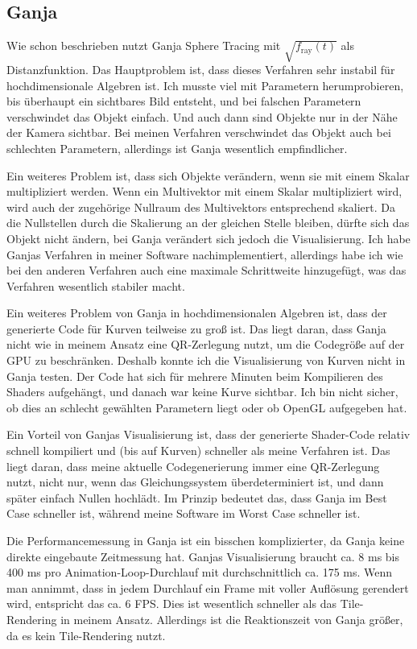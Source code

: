 \documentclass[
	ngerman,%
	accentcolor=9c,%
	ruledheaders=section,%
	class=report,%
	thesis={type=bachelor},%
	fontsize=11pt,%
	parskip=half-,%
	custommargins=true,%
	marginpar=false,%
]{tudapub}
\begin{document}
\subsection{Ganja}
Wie schon beschrieben nutzt Ganja Sphere Tracing mit \(\sqrt{f_\text{ray}(t)}\)
als Distanzfunktion. Das Hauptproblem ist, dass dieses Verfahren sehr instabil für hochdimensionale Algebren ist. Ich musste viel mit Parametern herumprobieren, bis überhaupt ein sichtbares Bild entsteht, und bei falschen Parametern verschwindet das Objekt einfach. Und auch dann sind Objekte nur in der Nähe der Kamera sichtbar. Bei meinen Verfahren verschwindet das Objekt auch bei schlechten Parametern, allerdings ist Ganja wesentlich empfindlicher.

Ein weiteres Problem ist, dass sich Objekte verändern, wenn sie mit einem Skalar multipliziert werden. Wenn ein Multivektor mit einem Skalar multipliziert wird, wird auch der zugehörige Nullraum des Multivektors entsprechend skaliert. Da die Nullstellen durch die Skalierung an der gleichen Stelle bleiben, dürfte sich das Objekt nicht ändern, bei Ganja verändert sich jedoch die Visualisierung. Ich habe Ganjas Verfahren in meiner Software nachimplementiert, allerdings habe ich wie bei den anderen Verfahren auch eine maximale Schrittweite hinzugefügt, was das Verfahren wesentlich stabiler macht.

Ein weiteres Problem von Ganja in hochdimensionalen Algebren ist, dass der generierte Code für Kurven teilweise zu groß ist. Das liegt daran, dass Ganja nicht wie in meinem Ansatz eine QR-Zerlegung nutzt, um die Codegröße auf der GPU zu beschränken. Deshalb konnte ich die Visualisierung von Kurven nicht in Ganja testen. Der Code hat sich für mehrere Minuten beim Kompilieren des Shaders aufgehängt, und danach war keine Kurve sichtbar. Ich bin nicht sicher, ob dies an schlecht gewählten Parametern liegt oder ob OpenGL aufgegeben hat.

Ein Vorteil von Ganjas Visualisierung ist, dass der generierte Shader-Code relativ schnell kompiliert und (bis auf Kurven) schneller als meine Verfahren ist. Das liegt daran, dass meine aktuelle Codegenerierung immer eine QR-Zerlegung nutzt, nicht nur, wenn das Gleichungssystem überdeterminiert ist, und dann später einfach Nullen hochlädt. Im Prinzip bedeutet das, dass Ganja im Best Case schneller ist, während meine Software im Worst Case schneller ist.

Die Performancemessung in Ganja ist ein bisschen komplizierter, da Ganja keine direkte eingebaute Zeitmessung hat.
Ganjas Visualisierung braucht ca. 8 ms bis 400 ms pro Animation-Loop-Durchlauf mit durchschnittlich ca. 175 ms. Wenn man annimmt, dass in jedem Durchlauf ein Frame mit voller Auflösung gerendert wird, entspricht das ca. 6 FPS. Dies ist wesentlich schneller als das Tile-Rendering in meinem Ansatz. Allerdings ist die Reaktionszeit von Ganja größer, da es kein Tile-Rendering nutzt.
\end{document}
